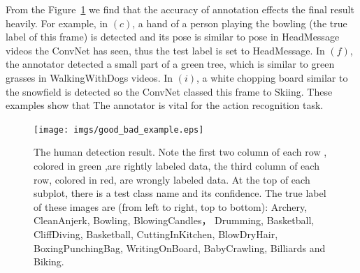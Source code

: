 \documentclass[10pt,twocolumn,letterpaper]{article}
\begin{document}
From the Figure~\ref{good_bad_example} we find that the accuracy of annotation effects the final result heavily. For example, in $(c)$, a hand of a person playing the bowling (the true label of this frame) is detected and its pose is similar to pose in HeadMessage videos the ConvNet has seen, thus the test label is set to HeadMessage. In $(f)$, the annotator detected a small part of a green tree, which is similar to green grasses in WalkingWithDogs videos. In $(i)$, a white chopping board similar to the snowfield is detected so the ConvNet classed this frame to Skiing. These examples show that The annotator is vital for the action recognition task.
\begin{figure}
	\begin{center}
		\texttt{[image: imgs/good\_bad\_example.eps]}
		\caption{The human detection result. Note the first two column of each row , colored in green ,are rightly labeled data,  the third column of each row, colored in red, are wrongly labeled data. At the top of each subplot, there is a test class name and its confidence. The true label of these images are (from left to right, top to bottom): Archery, CleanAnjerk, Bowling, BlowingCandles， Drumming, Basketball,  CliffDiving, Basketball, CuttingInKitchen, BlowDryHair, BoxingPunchingBag, WritingOnBoard, BabyCrawling, Billiards and Biking.}
		\label{good_bad_example}
	\end{center}
\end{figure}
\end{document}
